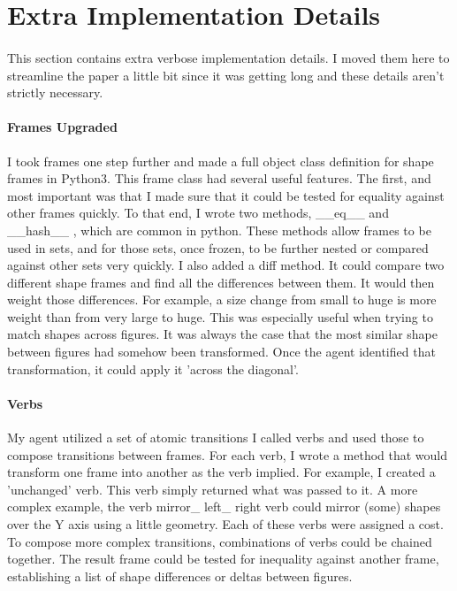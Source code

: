 \documentclass[12pt]{article}
\begin{document}
\section{Extra Implementation Details}
\paragraph{}
This section contains extra verbose implementation details. I moved them here to streamline the paper a little bit since it was getting long and these details aren't strictly necessary. 
\paragraph{Frames Upgraded}
I took frames one step further and made a full object class definition for shape frames in Python3. This frame class had several useful features. The first, and most important was that I made sure that it could be tested for equality against other frames quickly. To that end, I wrote two methods, \_\_eq\_\_ and
\_\_hash\_\_ , which are common in python. These methods allow frames to be used in sets, and for those sets, once frozen, to be further nested or compared against other sets very quickly. I also added a diff method. It could compare two different shape frames and find all the differences between them. It would then weight those differences. For example, a size change from small to huge is more weight than from very large to huge. This was especially useful when trying to match shapes across figures. It was always the case that the most similar shape between figures had somehow been transformed. Once the agent identified that transformation, it could apply it 'across the diagonal'.
\paragraph{Verbs}
My agent utilized a set of atomic transitions I called verbs and used those to compose transitions between frames. For each verb, I wrote a method that would transform one frame into another as the verb implied. For example, I created a 'unchanged' verb. This verb simply returned what was passed to it. A more complex example, the verb mirror\_ left\_ right verb could mirror (some) shapes over the Y axis using a little geometry. Each of these verbs were assigned a cost. To compose more complex transitions, combinations of verbs could be chained together. The result frame could be tested for inequality against another frame, establishing a list of shape differences or deltas between figures.

	\newpage
	
	
	
\end{document}
